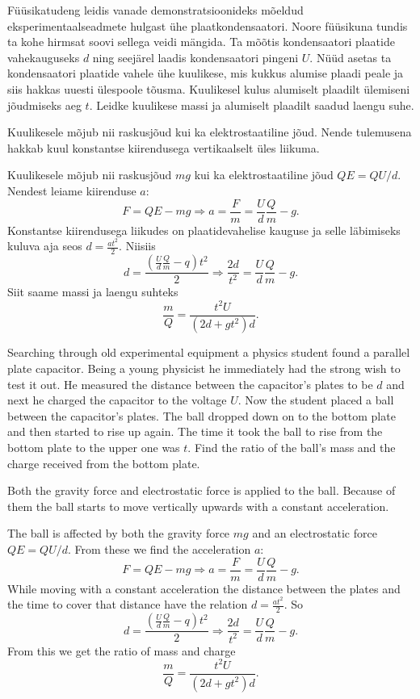 
Füüsikatudeng leidis vanade demonstratsioonideks mõeldud eksperimentaalseadmete
hulgast ühe plaatkondensaatori. Noore füüsikuna tundis ta kohe hirmsat soovi
sellega veidi mängida. Ta mõõtis kondensaatori plaatide vahekauguseks $d$
ning seejärel laadis kondensaatori pingeni $U$. Nüüd asetas ta
kondensaatori plaatide vahele ühe kuulikese, mis kukkus alumise plaadi peale
ja siis hakkas uuesti ülespoole tõusma. Kuulikesel kulus alumiselt plaadilt
ülemiseni jõudmiseks aeg $t$. Leidke kuulikese massi ja alumiselt plaadilt
saadud laengu suhe.

\hint
Kuulikesele mõjub nii raskusjõud kui ka elektrostaatiline jõud. Nende tulemusena hakkab kuul konstantse kiirendusega vertikaalselt üles liikuma.

\solu
Kuulikesele mõjub nii raskusjõud $mg$ kui ka elektrostaatiline jõud $QE=QU/d$. Nendest leiame kiirenduse $a$:
\[ F = QE - mg \Rightarrow a = \frac{F}{m} = \frac{U}{d}\frac{Q}{m} - g. \]
Konstantse kiirendusega liikudes on plaatidevahelise kauguse ja selle läbimiseks kuluva aja seos $ d = \frac{at^2}{2} $. Niisiis
\[ d = \frac{\left(\frac{U}{d}\frac{Q}{m} - q\right)t^2}{2} \Rightarrow \frac{2d}{t^2} = \frac{U}{d}\frac{Q}{m} - g. \]
Siit saame massi ja laengu suhteks
\[ \frac{m}{Q} = \frac{t^2U}{\left(2d + gt^2\right)d}. \]

Searching through old experimental equipment a physics student found a parallel plate capacitor. Being a young physicist he immediately had the strong wish to test it out. He measured the distance between the capacitor’s plates to be $d$ and next he charged the capacitor to the voltage $U$. Now the student placed a ball between the capacitor’s plates. The ball dropped down on to the bottom plate and then started to rise up again. The time it took the ball to rise from the bottom plate to the upper one was $t$. Find the ratio of the ball’s mass and the charge received from the bottom plate.

\hinteng
Both the gravity force and electrostatic force is applied to the ball. Because of them the ball starts to move vertically upwards with a constant acceleration.

\solueng
The ball is affected by both the gravity force $mg$ and an electrostatic force $QE=QU/d$. From these we find the acceleration $a$:
\[ F = QE - mg \Rightarrow a = \frac{F}{m} = \frac{U}{d}\frac{Q}{m} - g. \]
While moving with a constant acceleration the distance between the plates and the time to cover that distance have the relation $ d = \frac{at^2}{2} $. So
\[ d = \frac{\left(\frac{U}{d}\frac{Q}{m} - q\right)t^2}{2} \Rightarrow \frac{2d}{t^2} = \frac{U}{d}\frac{Q}{m} - g. \] 
From this we get the ratio of mass and charge
\[ \frac{m}{Q} = \frac{t^2U}{\left(2d + gt^2\right)d}.  \]
\probend